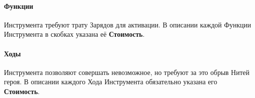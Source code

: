 \paragraph{Функции }Инструмента требуют трату Зарядов для активации. В описании каждой Функции Инструмента в скобках указана её \textbf{Стоимость}.
\paragraph{Ходы }Инструмента позволяют совершать невозможное, но требуют за это обрыв Нитей героя. В описании каждого Хода Инструмента обязательно указана его \textbf{Стоимость}.
